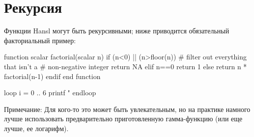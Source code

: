 \section{Рекурсия}

Функции Hansl могут быть рекурсивными; ниже приводится обязательный
факториальный пример:
\begin{code}
function scalar factorial(scalar n)
    if (n<0) || (n>floor(n))
        # filter out everything that isn't a 
        # non-negative integer
        return NA
    elif n==0
        return 1
    else
        return n * factorial(n-1)
    endif
end function

loop i = 0 .. 6
    printf "%
endloop
\end{code}
Примечание: Для кого-то это может быть увлекательным, но на практике
намного лучше использовать предварительно приготовленную гамма-функцию
(или еще лучше, ее логарифм).

